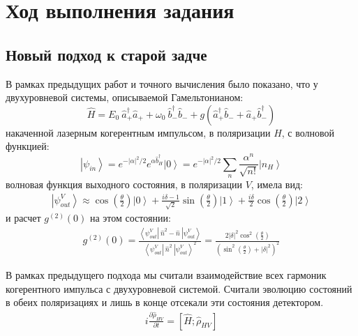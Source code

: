 \documentclass[11pt]{article}    %
\begin{document}
\newpage

\section{Ход выполнения задания}

\subsection{Новый подход к старой задче}
В рамках предыдущих работ и точного вычисления было показано, что у двухуровневой системы, описываемой Гамельтонианом:
\begin{equation}
    \hat{H} = E_0 \ \hat{a}^{\dag}_{+} \hat{a}_{+} + \omega_0 \ \hat{b}^{\dag}_{-} \hat{b}_{-} +  g \left( \hat{a}^{\dag}_{+} \hat{b}_{-} + \hat{a}_{+} \hat{b}^{\dag}_{-} \right)
\end{equation}
накаченной лазерным когерентным импульсом, в поляризации $H$, с волновой функцией:
\begin{equation}
    \left| \psi_{in} \right> = e^{-\left| \alpha \right|^2 / 2} e^{\alpha \hat{b}^{\dag}_H} \left| 0 \right> = e^{-\left| \alpha \right|^2 / 2} \sum_n \frac{\alpha^n}{\sqrt{n!}}  \left| n_H \right>
\end{equation}
волновая функция выходного состояния, в поляризации $V$, имела вид:
\begin{gather}
    \left| \psi_{out}^V \right> \approx \cos \left( \frac{\theta }{2} \right) \left| 0 \right> + \frac{i \delta - 1}{\sqrt{2}} \sin \left( \frac{\theta}{2} \right) \left| 1 \right> + \frac{i \delta}{2} \cos \left( \frac{\theta}{2} \right) \left| 2 \right>
\end{gather}
и расчет $g^{(2)}(0)$ на этом состоянии:
\begin{gather}
    g^{(2)}(0) = \frac{ \left< \psi_{out}^V \left| \ \hat{n}^2 - \hat{n} \ \right| \psi_{out}^V \right>}{\left< \psi_{out}^V \left| \ \hat{n}^2 \ \right| \psi_{out}^V \right> ^2 } = \frac{2\left| \delta \right|^2 \cos^2 \left( \frac{\theta}{2} \right) }{\left( \sin^2 \left( \frac{\theta}{2}\right) + \left| \delta \right|^2 \right)^2}
\end{gather}


В рамках предыдущего подхода мы считали взаимодействие всех гармоник когерентного импульса с двухуровневой системой.
Считали эволюцию состояний в обеих поляризациях и лишь в конце отсекали эти состояния детектором.
\begin{gather}
    i \frac{\partial \hat{\rho}_{HV} }{\partial t} = \left[ \hat{H} ; \hat{\rho}_{HV} \right]
\end{gather}
\end{document}
